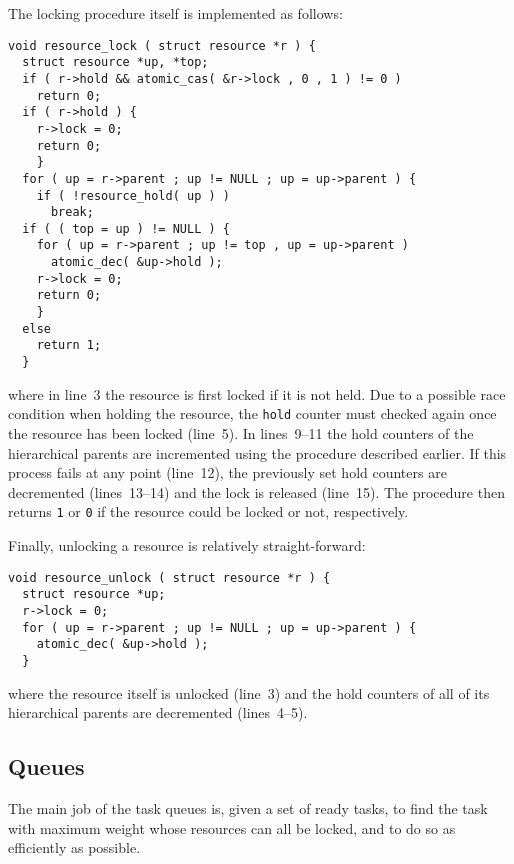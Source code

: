 \documentclass[preprint]{elsarticle}
\begin{document}
The locking procedure itself is implemented as follows:
\begin{center}\begin{minipage}{0.9\textwidth}
    \begin{lstlisting}
void resource_lock ( struct resource *r ) {
  struct resource *up, *top;
  if ( r->hold && atomic_cas( &r->lock , 0 , 1 ) != 0 )
    return 0;
  if ( r->hold ) {
    r->lock = 0;
    return 0;
    }
  for ( up = r->parent ; up != NULL ; up = up->parent ) {
    if ( !resource_hold( up ) )
      break;
  if ( ( top = up ) != NULL ) {
    for ( up = r->parent ; up != top , up = up->parent )
      atomic_dec( &up->hold );
    r->lock = 0;
    return 0;
    }
  else
    return 1;
  }
    \end{lstlisting}
\end{minipage}\end{center}
\noindent where in line~3 the resource is first locked if it
is not held.
Due to a possible race condition when holding the resource,
the {\tt hold} counter must checked again once the resource
has been locked (line~5).
In lines~9--11 the hold counters of the hierarchical parents
are incremented using the procedure described earlier.
If this process fails at any point (line~12), the
previously set hold counters are decremented (lines~13--14)
and the lock is released (line~15).
The procedure then returns {\tt 1} or {\tt 0} if the resource
could be locked or not, respectively.

Finally, unlocking a resource is relatively straight-forward:
\begin{center}\begin{minipage}{0.9\textwidth}
    \begin{lstlisting}
void resource_unlock ( struct resource *r ) {
  struct resource *up;
  r->lock = 0;
  for ( up = r->parent ; up != NULL ; up = up->parent ) {
    atomic_dec( &up->hold );
  }
    \end{lstlisting}
\end{minipage}\end{center}
\noindent where the resource itself is unlocked (line~3)
and the hold counters of all of its hierarchical parents
are decremented (lines~4--5).


\subsection{Queues}

The main job of the task queues is, given a set of ready tasks,
to find the task with maximum weight whose resources can all
be locked, and to do so as efficiently as possible.
\end{document}
